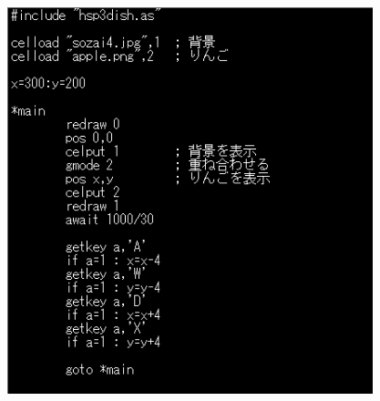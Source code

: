 \documentclass[a4paper,dvipdfmx]{jarticle}
\begin{document}
\begin{center}
\includegraphics[width=10.61cm,height=11.229cm]{text04-img/text04-img037.png}

\end{center}

\bigskip


\bigskip


\bigskip


\bigskip


\bigskip


\bigskip


\bigskip


\bigskip


\bigskip


\bigskip


\bigskip


\bigskip


\bigskip


\bigskip


\bigskip


\bigskip


\bigskip


\bigskip


\bigskip


\bigskip


\bigskip


\bigskip


\bigskip


\bigskip


\bigskip
\end{document}
